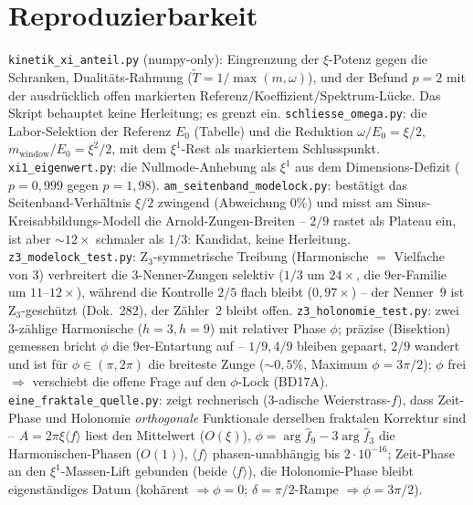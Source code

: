 \section{Reproduzierbarkeit}\label{sec:repro-286}
\texttt{kinetik\_xi\_anteil.py} (numpy-only): Eingrenzung der $\xi$-Potenz gegen die Schranken,
Dualitäts-Rahmung ($\tilde T=1/\max(m,\omega)$), und der Befund $p=2$ mit der ausdrücklich offen
markierten Referenz/Koeffizient/Spektrum-Lücke. Das Skript behauptet keine Herleitung; es grenzt ein. \texttt{schliesse\_omega.py}: die Labor-Selektion der Referenz $E_0$ (Tabelle) und die Reduktion $\omega/E_0=\xi/2$, $m_{\text{window}}/E_0=\xi^2/2$, mit dem $\xi^1$-Rest als markiertem Schlusspunkt. \texttt{xi1\_eigenwert.py}: die Nullmode-Anhebung als $\xi^1$ aus dem Dimensions-Defizit ($p=0{,}999$ gegen $p=1{,}98$). \texttt{am\_seitenband\_modelock.py}: bestätigt das Seitenband-Verhältnis $\xi/2$ zwingend (Abweichung $0\%$) und misst am Sinus-Kreisabbildungs-Modell die Arnold-Zungen-Breiten -- $2/9$ rastet als Plateau ein, ist aber $\sim\!12\times$ schmaler als $1/3$: Kandidat, keine Herleitung. \texttt{z3\_modelock\_test.py}: Z$_3$-symmetrische Treibung (Harmonische $=$ Vielfache von $3$) verbreitert die $3$-Nenner-Zungen selektiv ($1/3$ um $24\times$, die $9$er-Familie um $11$--$12\times$), während die Kontrolle $2/5$ flach bleibt ($0{,}97\times$) -- der Nenner~$9$ ist Z$_3$-geschützt (Dok.~282), der Zähler~$2$ bleibt offen. \texttt{z3\_holonomie\_test.py}: zwei $3$-zählige Harmonische ($h{=}3,h{=}9$) mit relativer Phase $\phi$; präzise (Bisektion) gemessen bricht $\phi$ die $9$er-Entartung auf -- $1/9,4/9$ bleiben gepaart, $2/9$ wandert und ist für $\phi\in(\pi,2\pi)$ die breiteste Zunge ($\sim\!0{,}5\%$, Maximum $\phi=3\pi/2$); $\phi$ frei $\Rightarrow$ verschiebt die offene Frage auf den $\phi$-Lock (BD17A). \texttt{eine\_fraktale\_quelle.py}: zeigt rechnerisch ($3$-adische Weierstrass-$f$), dass Zeit-Phase und Holonomie \emph{orthogonale} Funktionale derselben fraktalen Korrektur sind -- $A=2\pi\xi\langle f\rangle$ liest den Mittelwert ($O(\xi)$), $\phi=\arg\hat f_9-3\arg\hat f_3$ die Harmonischen-Phasen ($O(1)$), $\langle f\rangle$ phasen-unabhängig bis $2\cdot10^{-16}$; Zeit-Phase an den $\xi^1$-Massen-Lift gebunden (beide $\langle f\rangle$), die Holonomie-Phase bleibt eigenständiges Datum (kohärent $\Rightarrow\phi=0$; $\delta=\pi/2$-Rampe $\Rightarrow\phi=3\pi/2$).
